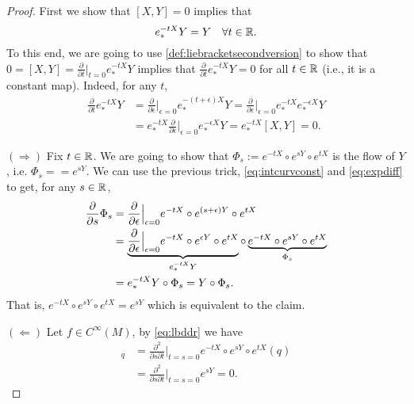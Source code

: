 \begin{proof}
  First we show that $[X,Y] = 0$ implies that
  \begin{equation}\label{eq:intcurvconst}
    e^{-tX}_*Y = Y \quad \forall t\in\mathbb{R}.
  \end{equation}
  To this end, we are going to use \eqref{def:liebracketsecondversion} to show that $0 = [X,Y] = \frac{\partial}{\partial t}\Big|_{t=0} e_*^{-t X} Y$ implies that $\frac{\partial}{\partial t} e_*^{-t X} Y = 0$ for all $t\in\mathbb{R}$ (i.e., it is a constant map).
  Indeed, for any $t$,
  \begin{align}
    \frac{\partial}{\partial t} e_*^{-t X} Y
    &= \frac{\partial}{\partial \epsilon} \Big|_{\epsilon = 0} e_*^{-(t+\epsilon) X} Y
    = \frac{\partial}{\partial \epsilon} \Big|_{\epsilon = 0} e_*^{-t X}e_*^{-\epsilon X} Y\\
    &= e_*^{-tX} \frac{\partial}{\partial \epsilon} \Big|_{\epsilon = 0} e_*^{-\epsilon X} Y
    = e_*^{-tX} [X,Y] = 0.
  \end{align}
  
  $(\Longrightarrow)$ Fix $t\in\mathbb{R}$. We are going to show that $\Phi_s := e^{-tX}\circ e^{sY}\circ e^{tX}$ is the flow of $Y$, i.e. $\Phi_s = = e^{sY}$.
  We can use the previous trick, \eqref{eq:intcurvconst} and \eqref{eq:expdiff} to get, for any $s\in\mathbb{R}$,
  \begin{align}
    \frac{\partial}{\partial s} \Phi_s
    &= \frac{\partial}{\partial \epsilon} \Big|_{\epsilon = 0} e^{-tX}\circ e^{(s+\epsilon) Y}\circ e^{tX} \\
    &= \LaTeXunderbrace{\frac{\partial}{\partial \epsilon} \Big|_{\epsilon = 0} e^{-tX}\circ e^{\epsilon Y}\circ e^{tX}}_{e^{-tX}_* Y} \circ \LaTeXunderbrace{e^{-tX}\circ e^{s Y}\circ e^{tX}}_{\Phi_s} \\
    &= e^{-tX}_* Y \circ \Phi_s = Y \circ \Phi_s.
  \end{align}
  That is, $e^{-tX}\circ e^{sY}\circ e^{tX} = e^{sY}$ which is equivalent to the claim.

  $(\Longleftarrow)$ Let $f\in C^\infty(M)$, by \eqref{eq:lbddr} we have
  \begin{align}
    [X,Y]_q &= \frac{\partial^2}{\partial s \partial t}\Big|_{t=s=0}e^{-tX}\circ e^{sY}\circ e^{t X}(q)\\
    &= \frac{\partial^2}{\partial s \partial t}\Big|_{t=s=0} e^{sY} = 0.
  \end{align}
\end{proof}

